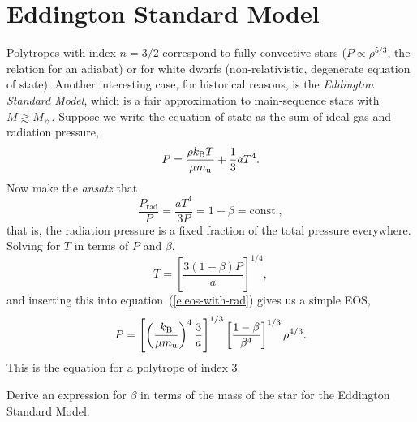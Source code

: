 \section{Eddington Standard Model}\label{s.LE-Eddington-Standard-Model}

Polytropes with index $n=3/2$ correspond to fully convective stars ($P \propto \rho^{5/3}$, the relation for an adiabat) or for white dwarfs (non-relativistic, degenerate equation of state). Another interesting case, for historical reasons, is the \emph{Eddington Standard Model}, which is a fair approximation to main-sequence stars with $M \gtrsim M_{\sun}$.  Suppose we write the equation of state as the sum of ideal gas and radiation pressure,
\begin{equation}\label{e.eos-with-rad}
 P  = \frac{\rho k_\mathrm{B} T}{\mu m_\mathrm{u}} + \frac{1}{3}a T^{4}.
\end{equation}
Now make the \emph{ansatz} that
\begin{equation}\label{e.beta-def}
\frac{P_{\mathrm{rad}}}{P} = \frac{aT^{4}}{3P} = 1-\beta = \mathrm{const.},
\end{equation}
that is, the radiation pressure is a fixed fraction of the total pressure everywhere.
Solving for $T$ in terms of $P$ and $\beta$,
\[ T = \left[\frac{3(1-\beta) P}{a}\right]^{1/4}, \]
and inserting this into equation~(\ref{e.eos-with-rad}) gives us a simple EOS,
\begin{equation}\label{e.beta-eos}
P = \left[\left(\frac{k_\mathrm{B}}{\mu m_\mathrm{u}}\right)^{4}\frac{3}{a}\right]^{1/3}\left[\frac{1-\beta}{\beta^{4}}\right]^{1/3} \rho^{4/3}.
\end{equation}
This is the equation for a polytrope of index 3.

\begin{exercisebox}
Derive an expression for $\beta$ in terms of the mass of the star for the Eddington Standard Model.
\end{exercisebox}

